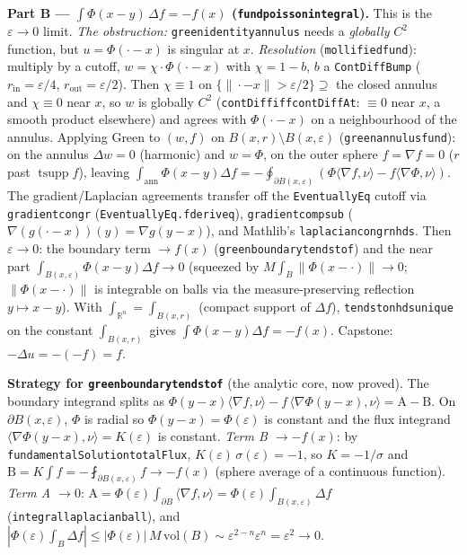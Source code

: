 ﻿\documentclass[12pt, a4paper]{article}
\renewcommand{\_}{\origunderscore\allowbreak}
\theoremstyle{definition}
\theoremstyle{plain}
\begin{document}
\textbf{Part B --- $\int \Phi(x-y)\,\Delta f = -f(x)$ (\texttt{fund\_poisson\_integral}).} This is
the $\varepsilon\to0$ limit. \emph{The obstruction:} \texttt{green\_identity\_annulus} needs a
\emph{globally} $C^2$ function, but $u = \Phi(\cdot - x)$ is singular at $x$. \emph{Resolution}
(\texttt{mollified\_fund}): multiply by a cutoff, $w = \chi \cdot \Phi(\cdot - x)$ with
$\chi = 1 - b$, $b$ a \texttt{ContDiffBump} ($r_{\mathrm{in}}=\varepsilon/4$,
$r_{\mathrm{out}}=\varepsilon/2$). Then $\chi\equiv1$ on $\{\|\cdot-x\|>\varepsilon/2\}\supseteq$
the closed annulus and $\chi\equiv0$ near $x$, so $w$ is globally $C^2$
(\texttt{contDiff\_iff\_contDiffAt}: $\equiv0$ near $x$, a smooth product elsewhere) and agrees
with $\Phi(\cdot-x)$ on a neighbourhood of the annulus. Applying Green to $(w,f)$ on
$B(x,r)\setminus B(x,\varepsilon)$ (\texttt{green\_annulus\_fund}): on the annulus $\Delta w = 0$
(harmonic) and $w=\Phi$, on the outer sphere $f=\nabla f=0$ ($r$ past $\operatorname{tsupp} f$),
leaving $\int_{\mathrm{ann}}\Phi(x-y)\Delta f = -\oint_{\partial B(x,\varepsilon)}
(\Phi\langle\nabla f,\nu\rangle - f\langle\nabla\Phi,\nu\rangle)$. The gradient/Laplacian
agreements transfer off the \texttt{EventuallyEq} cutoff via \texttt{gradient\_congr}
(\texttt{EventuallyEq.fderiv\_eq}), \texttt{gradient\_comp\_sub}
($\nabla(g(\cdot-x))(y)=\nabla g(y-x)$), and Mathlib's \texttt{laplacian\_congr\_nhds}. Then
$\varepsilon\to0$: the boundary term $\to f(x)$ (\texttt{green\_boundary\_tendsto\_f}) and the near
part $\int_{B(x,\varepsilon)}\Phi(x-y)\Delta f \to 0$ (squeezed by
$M\!\int_{B}\|\Phi(x-\cdot)\|\to0$; $\|\Phi(x-\cdot)\|$ is integrable on balls via the
measure-preserving reflection $y\mapsto x-y$). With $\int_{\mathbb{R}^n}=\int_{B(x,r)}$ (compact
support of $\Delta f$), \texttt{tendsto\_nhds\_unique} on the constant $\int_{B(x,r)}$ gives
$\int \Phi(x-y)\Delta f = -f(x)$. Capstone: $-\Delta u = -(-f) = f$.

\textbf{Strategy for \texttt{green\_boundary\_tendsto\_f}} (the analytic core, now proved). The
boundary integrand splits as $\Phi(y-x)\langle\nabla f,\nu\rangle - f\,\langle\nabla\Phi(y-x),\nu\rangle
= \mathrm{A} - \mathrm{B}$. On $\partial B(x,\varepsilon)$, $\Phi$ is radial so $\Phi(y-x)=\Phi(\varepsilon)$
is constant and the flux integrand $\langle\nabla\Phi(y-x),\nu\rangle = K(\varepsilon)$ is constant.
\emph{Term B $\to -f(x)$}: by \texttt{fundamentalSolution\_totalFlux}, $K(\varepsilon)\,\sigma(\varepsilon)
= -1$, so $K = -1/\sigma$ and $\mathrm{B} = K\!\int f = -\fint_{\partial B(x,\varepsilon)} f \to -f(x)$
(sphere average of a continuous function). \emph{Term A $\to 0$}: $\mathrm{A} = \Phi(\varepsilon)\int_{\partial
B}\langle\nabla f,\nu\rangle = \Phi(\varepsilon)\int_{B(x,\varepsilon)}\Delta f$
(\texttt{integral\_laplacian\_ball}), and $|\Phi(\varepsilon)\!\int_B\Delta f| \le
|\Phi(\varepsilon)|\,M\,\mathrm{vol}(B) \sim \varepsilon^{2-n}\varepsilon^{n} = \varepsilon^2 \to 0$.
\end{document}

